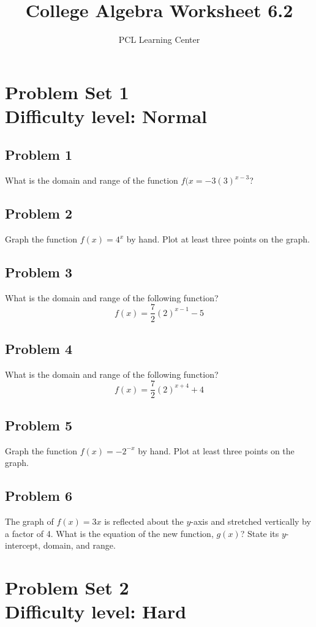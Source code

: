 \documentclass[12pt]{article}
\title{College Algebra Worksheet 6.2}
\author{PCL Learning Center}
\date{}
\begin{document}
\maketitle

\section*{Problem Set 1\\Difficulty level: Normal}
\subsection*{Problem 1}
What is the domain and range of the function \(f(x=-3(3)^{x-3}\)?

\subsection*{Problem 2} Graph the function \(f(x)=4^x\) by hand. Plot at least three points on the graph.

\subsection*{Problem 3}
What is the domain and range of the following function?
\[f(x)=\dfrac{7}{2}(2)^{x-1}-5\]

\subsection*{Problem 4}
What is the domain and range of the following function?
\[f(x)=\dfrac{7}{2}(2)^{x+4}+4\]

\subsection*{Problem 5}
Graph the function \(f(x)=-2^{-x}\) by hand. Plot at least three points on the graph.

\subsection*{Problem 6}
The graph of \(f(x)=3x\) is reflected about the \(y\)-axis and stretched vertically by a factor of 4. What is the equation of the new function, \(g(x)\)? State its \(y\)-intercept, domain, and range.

\section*{Problem Set 2\\Difficulty level: Hard}
\end{document}
